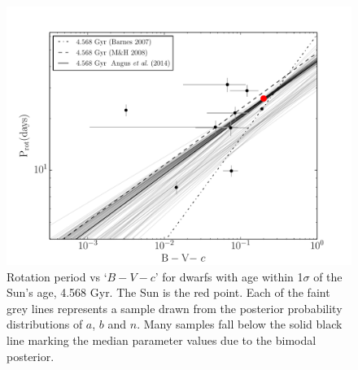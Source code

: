 \documentclass[useAMS, usenatbib]{mn2e}
\begin{document}
\begin{figure}
\begin{center}
\includegraphics[width=6in, clip=true, trim=0 0 0.5in 0]{p_vs_bv_solar.pdf}
\caption{Rotation period vs `$B-V-c$' for dwarfs with age within 1$\sigma$ of
	the Sun's age, 4.568 Gyr.
	The Sun is the red point.
	Each of the faint grey lines represents a
	sample drawn from the posterior probability distributions of $a$, $b$ and $n$.
	Many samples fall below the solid black line marking the median parameter
	values due to the bimodal posterior.
\label{fig:p_vs_bv_solar}}
\end{center}
\end{figure}
\end{document}
